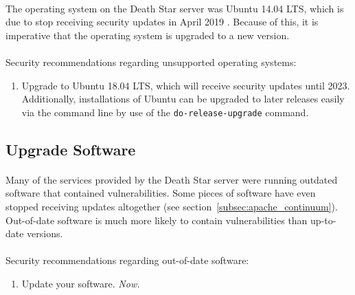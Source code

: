 \documentclass{article}
\begin{document}
\paragraph{}
The operating system on the Death Star server was Ubuntu 14.04 LTS, which is due to stop receiving security updates in April 2019 \parencite{ubuntureleases}.
Because of this, it is imperative that the operating system is upgraded to a new version.

\paragraph{}
\begin{adjustwidth}{1.5cm}{1.5cm}
	Security recommendations regarding unsupported operating systems:
	\begin{enumerate}
		\item Upgrade to Ubuntu 18.04 LTS, which will receive security updates until 2023. Additionally, installations of Ubuntu can be upgraded to later releases easily via the command line by use of the \texttt{do-release-upgrade} command.
	\end{enumerate}
\end{adjustwidth}

\subsection{Upgrade Software}
\label{subsec:upgrade_software}
\paragraph{}
Many of the services provided by the Death Star server were running outdated software that contained vulnerabilities.
Some pieces of software have even stopped receiving updates altogether (see section~\ref{subsec:apache_continuum}).
Out-of-date software is much more likely to contain vulnerabilities than up-to-date versions.

\paragraph{}
\begin{adjustwidth}{1.5cm}{1.5cm}
	Security recommendations regarding out-of-date software:
	\begin{enumerate}
		\item Update your software. \emph{Now.}
	\end{enumerate}
\end{adjustwidth}
\end{document}
